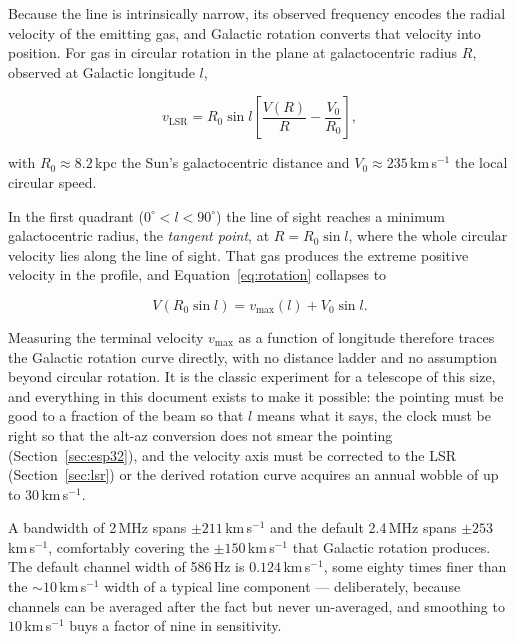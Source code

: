 \documentclass[11pt,a4paper]{article}
\begin{document}
Because the line is intrinsically narrow, its observed frequency encodes the radial velocity of the emitting gas, and Galactic rotation converts that velocity into position. For gas in circular rotation in the plane at galactocentric radius $R$, observed at Galactic longitude $l$,

\begin{equation}
v_\text{LSR} = R_0 \sin l \left[\frac{V(R)}{R} - \frac{V_0}{R_0}\right],
\label{eq:rotation}
\end{equation}

with $R_0 \approx 8.2$\,kpc the Sun's galactocentric distance and $V_0 \approx 235$\,km\,s$^{-1}$ the local circular speed.

In the first quadrant ($0^\circ < l < 90^\circ$) the line of sight reaches a minimum galactocentric radius, the \emph{tangent point}, at $R = R_0 \sin l$, where the whole circular velocity lies along the line of sight. That gas produces the extreme positive velocity in the profile, and Equation~\eqref{eq:rotation} collapses to

\begin{equation}
V(R_0 \sin l) = v_\text{max}(l) + V_0 \sin l.
\end{equation}

Measuring the terminal velocity $v_\text{max}$ as a function of longitude therefore traces the Galactic rotation curve directly, with no distance ladder and no assumption beyond circular rotation. It is the classic experiment for a telescope of this size, and everything in this document exists to make it possible: the pointing must be good to a fraction of the beam so that $l$ means what it says, the clock must be right so that the alt-az conversion does not smear the pointing (Section~\ref{sec:esp32}), and the velocity axis must be corrected to the LSR (Section~\ref{sec:lsr}) or the derived rotation curve acquires an annual wobble of up to $30$\,km\,s$^{-1}$.

A bandwidth of 2\,MHz spans $\pm211$\,km\,s$^{-1}$ and the default 2.4\,MHz spans $\pm253$\,km\,s$^{-1}$, comfortably covering the $\pm150$\,km\,s$^{-1}$ that Galactic rotation produces. The default channel width of 586\,Hz is $0.124$\,km\,s$^{-1}$, some eighty times finer than the $\sim10$\,km\,s$^{-1}$ width of a typical line component --- deliberately, because channels can be averaged after the fact but never un-averaged, and smoothing to $10$\,km\,s$^{-1}$ buys a factor of nine in sensitivity.
\end{document}
